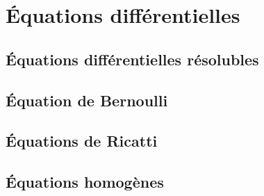 

					\section{Équations différentielles}

					\subsection{Équations différentielles résolubles}


					\subsection{Équation de Bernoulli}


					\subsection{Équations de Ricatti}



					\subsection{Équations homogènes}


